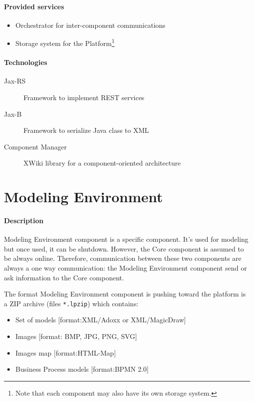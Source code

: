 \documentclass{learnpad}
\begin{document}
\paragraph{Provided services}
\begin{itemize}
	\item Orchestrator for inter-component communications
	\item Storage system for the \learnpad Platform\footnote{Note that each component may also have its own storage system.}
\end{itemize}

\paragraph{Technologies}
\begin{description}
	\item[Jax-RS] Framework to implement REST services
	\item[Jax-B] Framework to serialize Java class to XML
	\item[Component Manager] XWiki library for a component-oriented architecture
\end{description}

\section{Modeling Environment}\label{sec:modeling-environment}
\paragraph{Description}
Modeling Environment component is a specific component.  It's used for modeling
but once used, it can be shutdown.  However, the \learnpad Core component is
assumed to be always online.  Therefore, communication between these two
components are always a one way communication: the Modeling Environment
component send or ask information to the \learnpad Core component.

The format Modeling Environment component is pushing toward the \learnpad
platform is a ZIP archive (files \verb+*.lpzip+) which contains:
\begin{itemize}
	\item Set of models [format:XML/Adoxx or XML/MagicDraw]
	\item Images [format: BMP, JPG, PNG, SVG]
	\item Images map [format:HTML-Map]
	\item Business Process models [format:BPMN 2.0]
\end{itemize}
\end{document}
